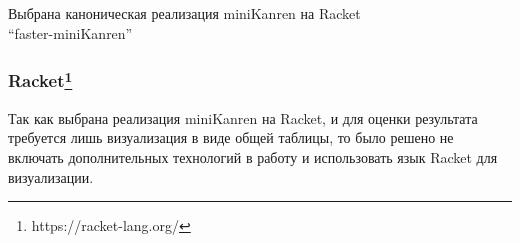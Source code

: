 

Выбрана каноническая реализация miniKanren на Racket \\``faster-miniKanren''~\cite{faster}


\subsubsection{Racket\footnote{https://racket-lang.org/}}
Так как выбрана реализация miniKanren на Racket, и для оценки результата требуется лишь визуализация в виде общей таблицы, то было решено не включать дополнительных технологий в работу и использовать язык Racket для визуализации.


